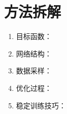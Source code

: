 \section{方法拆解}

\begin{enumerate}
  \item 目标函数：
  \item 网络结构：
  \item 数据采样：
  \item 优化过程：
  \item 稳定训练技巧：
\end{enumerate}

